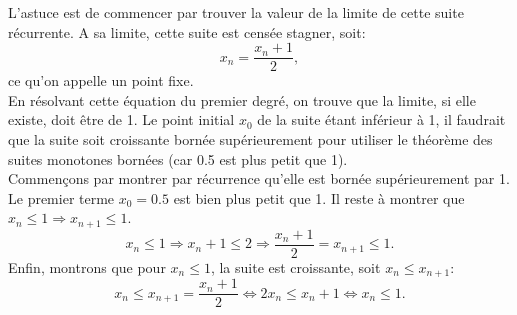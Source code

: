 \documentclass[a4paper, 12pt, french, twoside]{article}
\begin{document}
\faLightbulbO \quad {} L'astuce est de commencer par trouver la valeur de la limite de cette suite récurrente. A sa limite, cette suite est censée stagner, soit:
\begin{equation}
    x_n = \frac{x_n + 1}{2},
\end{equation}
ce qu'on appelle un point fixe.\\
En résolvant cette équation du premier degré, on trouve que la limite, si elle existe, doit être de 1. Le point initial $x_0$ de la suite étant inférieur à 1, il faudrait que la suite soit croissante bornée supérieurement pour utiliser le théorème des suites monotones bornées (car 0.5 est plus petit que 1).\\
Commençons par montrer par récurrence qu'elle est bornée supérieurement par 1. Le premier terme $x_0 = 0.5$ est bien plus petit que 1. Il reste à montrer que $x_n \leq 1 \Rightarrow x_{n+1} \leq 1$.
\begin{equation}
    x_n \leq 1 \Rightarrow x_n + 1 \leq 2 \Rightarrow \frac{x_n + 1}{2} = x_{n+1} \leq 1.
\end{equation}
Enfin, montrons que pour $x_n \leq 1$, la suite est croissante, soit $x_n \leq x_{n+1}$:
\begin{equation}
    x_n \leq x_{n+1} = \frac{x_n + 1}{2} \iff 2x_n \leq x_n + 1 \iff x_n \leq 1.
\end{equation}
\end{document}
